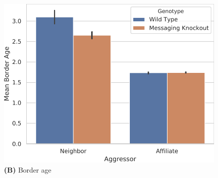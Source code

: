 \begin{figure}[!htbp]
\begin{center}
\begin{minipage}[t]{0.5\linewidth}
\hspace*{\fill}%
\begin{minipage}[t]{0.8\linewidth}
\centering
\vspace{0pt} %
\begin{minipage}[b]{\textwidth}
\includegraphics[width=\textwidth]{img/knockout/intermessaging-intergroup_border/title=comboborderage+_data_hathash_hash=8369fa84222d9217+_script_fullcat_hash=c576822d0876c8a8+_source_hash=53a2252-clean+ext=}\\
{\textbf{(B)} Border age}
\end{minipage}
\end{minipage}%
\hspace*{\fill}

\vspace{1ex}



\end{minipage}
\end{center}
\end{figure}
